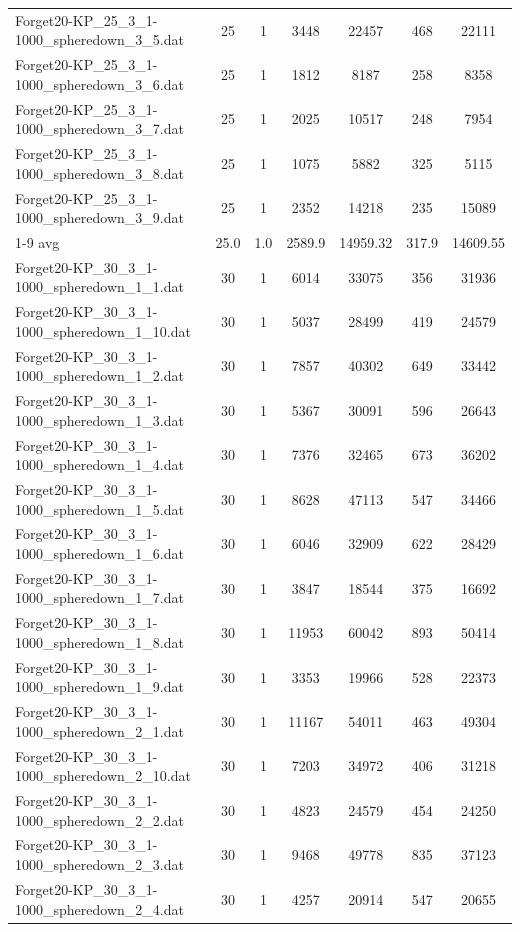 \begin{table}[!ht]
\begin{tabular}{lcccccc}
Forget20-KP\_25\_3\_1-1000\_spheredown\_3\_5.dat & 25 & 1 & 3448 & 22457 & 468 & 22111 \\
Forget20-KP\_25\_3\_1-1000\_spheredown\_3\_6.dat & 25 & 1 & 1812 & 8187 & 258 & 8358 \\
Forget20-KP\_25\_3\_1-1000\_spheredown\_3\_7.dat & 25 & 1 & 2025 & 10517 & 248 & 7954 \\
Forget20-KP\_25\_3\_1-1000\_spheredown\_3\_8.dat & 25 & 1 & 1075 & 5882 & 325 & 5115 \\
Forget20-KP\_25\_3\_1-1000\_spheredown\_3\_9.dat & 25 & 1 & 2352 & 14218 & 235 & 15089 \\
\cline{1-9} avg & 25.0 & 1.0 & 2589.9& 14959.32 & 317.9& 14609.55\\ \hline
Forget20-KP\_30\_3\_1-1000\_spheredown\_1\_1.dat & 30 & 1 & 6014 & 33075 & 356 & 31936 \\
Forget20-KP\_30\_3\_1-1000\_spheredown\_1\_10.dat & 30 & 1 & 5037 & 28499 & 419 & 24579 \\
Forget20-KP\_30\_3\_1-1000\_spheredown\_1\_2.dat & 30 & 1 & 7857 & 40302 & 649 & 33442 \\
Forget20-KP\_30\_3\_1-1000\_spheredown\_1\_3.dat & 30 & 1 & 5367 & 30091 & 596 & 26643 \\
Forget20-KP\_30\_3\_1-1000\_spheredown\_1\_4.dat & 30 & 1 & 7376 & 32465 & 673 & 36202 \\
Forget20-KP\_30\_3\_1-1000\_spheredown\_1\_5.dat & 30 & 1 & 8628 & 47113 & 547 & 34466 \\
Forget20-KP\_30\_3\_1-1000\_spheredown\_1\_6.dat & 30 & 1 & 6046 & 32909 & 622 & 28429 \\
Forget20-KP\_30\_3\_1-1000\_spheredown\_1\_7.dat & 30 & 1 & 3847 & 18544 & 375 & 16692 \\
Forget20-KP\_30\_3\_1-1000\_spheredown\_1\_8.dat & 30 & 1 & 11953 & 60042 & 893 & 50414 \\
Forget20-KP\_30\_3\_1-1000\_spheredown\_1\_9.dat & 30 & 1 & 3353 & 19966 & 528 & 22373 \\
Forget20-KP\_30\_3\_1-1000\_spheredown\_2\_1.dat & 30 & 1 & 11167 & 54011 & 463 & 49304 \\
Forget20-KP\_30\_3\_1-1000\_spheredown\_2\_10.dat & 30 & 1 & 7203 & 34972 & 406 & 31218 \\
Forget20-KP\_30\_3\_1-1000\_spheredown\_2\_2.dat & 30 & 1 & 4823 & 24579 & 454 & 24250 \\
Forget20-KP\_30\_3\_1-1000\_spheredown\_2\_3.dat & 30 & 1 & 9468 & 49778 & 835 & 37123 \\
Forget20-KP\_30\_3\_1-1000\_spheredown\_2\_4.dat & 30 & 1 & 4257 & 20914 & 547 & 20655 \\

\end{tabular}
\end{table}
